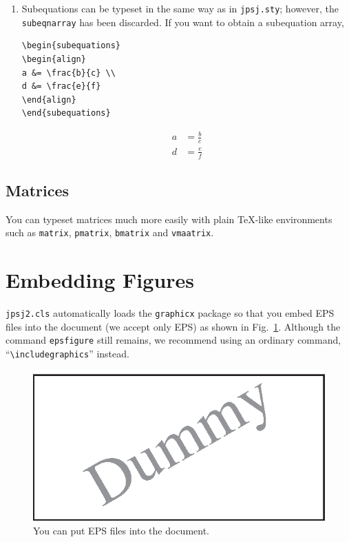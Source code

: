 \documentclass{jpsj2}
\begin{document}
\begin{enumerate}
\medskip
\item Subequations can be typeset in the same way as in \texttt{jpsj.sty}; however, the \texttt{subeqnarray} has been discarded.  If you want to obtain a subequation array,

\begin{verbatim}
\begin{subequations}
\begin{align}
a &= \frac{b}{c} \\
d &= \frac{e}{f}
\end{align}
\end{subequations}
\end{verbatim}

\begin{subequations}
\begin{align}
a &= \frac{b}{c} \\
d &= \frac{e}{f}
\end{align}
\end{subequations}

\end{enumerate}

\subsection{Matrices}

You can typeset matrices much more easily with plain \TeX{}-like environments such as \texttt{matrix}, \texttt{pmatrix}, \texttt{bmatrix} and \texttt{vmaatrix}.

\section{Embedding Figures}

\texttt{jpsj2.cls} automatically loads the \texttt{graphicx} package so that you embed EPS files into the document (we accept only EPS) as shown in Fig.~\ref{f1}.  Although the command \verb|epsfigure| still remains, we recommend using an ordinary command, ``\verb|\includegraphics|'' instead.

\begin{figure}[t]
\begin{center}
\includegraphics[width=12cm]{dummy.eps}
\end{center}
\caption{You can put EPS files into the document.}
\label{f1}
\end{figure}
\end{document}
